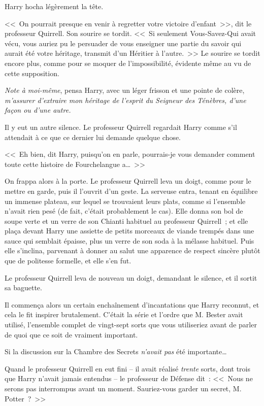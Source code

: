 Harry hocha légèrement la tête.

<<~On pourrait presque en venir à regretter votre victoire d'enfant~>>, dit le professeur Quirrell. Son sourire se tordit. <<~Si seulement Vous-Savez-Qui avait vécu, vous auriez pu le persuader de vous enseigner une partie du savoir qui aurait été votre héritage, transmit d'un Héritier à l'autre.~>> Le sourire se tordit encore plus, comme pour se moquer de l'impossibilité, évidente même au vu de cette supposition.

\emph{Note à moi-même}, pensa Harry, avec un léger frisson et une pointe de colère, \emph{m'assurer d'extraire mon héritage de l'esprit du Seigneur des Ténèbres, d'une façon ou d'une autre.}

Il y eut un autre silence. Le professeur Quirrell regardait Harry comme s'il attendait à ce que ce dernier lui demande quelque chose.

<<~Eh bien, dit Harry, puisqu'on en parle, pourrais-je vous demander comment toute cette histoire de Fourchelangue a…~>>

On frappa alors à la porte. Le professeur Quirrell leva un doigt, comme pour le mettre en garde, puis il l'ouvrit d'un geste. La serveuse entra, tenant en équilibre un immense plateau, sur lequel se trouvaient leurs plats, comme si l'ensemble n'avait rien pesé (de fait, c'était probablement le cas). Elle donna son bol de soupe verte et un verre de son Chianti habituel au professeur Quirrell~; et elle plaça devant Harry une assiette de petits morceaux de viande trempés dans une sauce qui semblait épaisse, plus un verre de son soda à la mélasse habituel. Puis elle s'inclina, parvenant à donner au salut une apparence de respect sincère plutôt que de politesse formelle, et elle s'en fut.

Le professeur Quirrell leva de nouveau un doigt, demandant le silence, et il sortit sa baguette.

Il commença alors un certain enchaînement d'incantations que Harry reconnut, et cela le fit inspirer brutalement. C'était la série et l'ordre que M. Bester avait utilisé, l'ensemble complet de vingt-sept sorts que vous utiliseriez avant de parler de quoi que ce soit de vraiment important.

Si la discussion sur la Chambre des Secrets \emph{n'avait pas} été importante…

Quand le professeur Quirrell en eut fini -- il avait réalisé \emph{trente} sorts, dont trois que Harry n'avait jamais entendus -- le professeur de Défense dit~: <<~Nous ne serons pas interrompus avant un moment. Sauriez-vous garder un secret, M. Potter~?~>>

